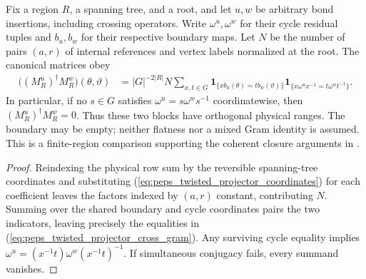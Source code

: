\begin{lemma}%
    \label{thm:peps_twisted_projector_cross_gram_coordinates}
    \leanok
    Fix a region $R$, a spanning tree, and a root, and let $u,w$ be
    arbitrary bond insertions, including crossing operators. Write
    $\omega^u,\omega^w$ for their cycle residual tuples and
    $b_u,b_w$ for their respective boundary maps. Let $N$ be
    the number of pairs $(a,r)$ of internal references and vertex
    labels normalized at the root. The canonical matrices obey
    \begin{align}
        \bigl((M_R^u)^\dagger M_R^w\bigr)(\theta,\vartheta)
         & = |G|^{-2|R|}N\sum_{x,t\in G}
        \mathbf 1_{\{x b_u(\theta)=t b_w(\vartheta)\}}
        \mathbf 1_{\{x\omega^ux^{-1}=t\omega^wt^{-1}\}}.
        \label{eq:peps_twisted_projector_cross_gram}
    \end{align}
    In particular, if no $s\in G$ satisfies
    $\omega^u=s\omega^ws^{-1}$ coordinatewise, then
    $(M_R^u)^\dagger M_R^w=0$. Thus these two blocks have
    orthogonal physical ranges. The boundary may be empty; neither
    flatness nor a mixed Gram identity is assumed.
    This is a finite-region comparison supporting the coherent closure
    arguments in \cite[\S6.3--6.4]{Schuch2010PEPS}.
\end{lemma}
\begin{proof}\leanok
    Reindexing the physical row sum by the reversible spanning-tree
    coordinates and substituting
    (\ref{eq:peps_twisted_projector_coordinates}) for each coefficient
    leaves the factors indexed by $(a,r)$ constant, contributing $N$.
    Summing over the shared boundary and cycle coordinates pairs the
    two indicators, leaving precisely the equalities in
    (\ref{eq:peps_twisted_projector_cross_gram}).
    Any surviving cycle equality implies
    $\omega^u=(x^{-1}t)\omega^w(x^{-1}t)^{-1}$.
    If simultaneous conjugacy fails, every summand vanishes.
\end{proof}

